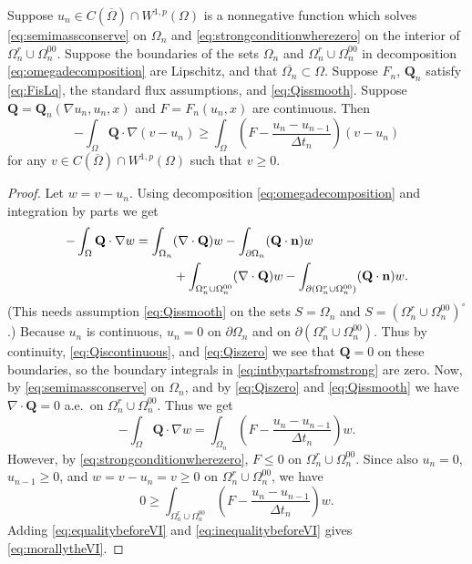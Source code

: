 \documentclass[final,onefignum]{siamart190516}
\newcommand\bn{\mathbf{n}}
\newcommand\bQ{\mathbf{Q}}
\newcommand{\Div}{\nabla\cdot}
\newcommand{\grad}{\nabla}
\begin{document}
\begin{theorem} \label{thm:strongimpliesweak}  Suppose $u_n \in C(\overline{\Omega}) \cap W^{1,p}(\Omega)$ is a nonnegative function which solves \eqref{eq:semimassconserve} on $\Omega_n$ and \eqref{eq:strongconditionwherezero} on the interior of $\Omega_n^r \cup \Omega_n^{00}$.  Suppose the boundaries of the sets $\Omega_n$ and $\Omega_n^r \cup \Omega_n^{00}$ in decomposition \eqref{eq:omegadecomposition} are Lipschitz, and that $\overline{\Omega_n} \subset \Omega$.  Suppose $F_n$, $\bQ_n$ satisfy \eqref{eq:FisLq}, the standard flux assumptions, and \eqref{eq:Qissmooth}.  Suppose $\bQ = \bQ_n(\grad u_n,u_n,x)$ and $F=F_n(u_n,x)$ are continuous.  Then
\begin{equation}
-\int_{\Omega} \bQ \cdot \grad(v-u_n) \ge \int_{\Omega} \left(F - \frac{u_n - u_{n-1}}{\Delta t_n}\right) (v-u_n) \label{eq:morallytheVI}
\end{equation}
for any $v \in C(\overline{\Omega}) \cap W^{1,p}(\Omega)$ such that $v \ge 0$.
\end{theorem}

\begin{proof}  Let $w=v-u_n$.  Using decomposition \eqref{eq:omegadecomposition} and integration by parts we get
\begin{align}
-\int_{\Omega} \bQ \cdot \grad w &= \int_{\Omega_n} (\Div \bQ) w - \int_{\partial \Omega_n} (\bQ \cdot \bn) w \label{eq:intbypartsfromstrong} \\
  &\qquad\quad + \int_{\Omega_n^r \cup \Omega_n^{00}} (\Div \bQ) w - \int_{\partial(\Omega_n^r \cup \Omega_n^{00})} (\bQ \cdot \bn) w. \notag
\end{align}
(This needs assumption \eqref{eq:Qissmooth} on the sets $S=\Omega_n$ and $S=(\Omega_n^r \cup \Omega_n^{00})^\circ$.)  Because $u_n$ is continuous, $u_n=0$ on $\partial \Omega_n$ and on $\partial(\Omega_n^r \cup \Omega_n^{00})$.  Thus by continuity, \eqref{eq:Qiscontinuous}, and \eqref{eq:Qiszero} we see that $\bQ=0$ on these boundaries, so the boundary integrals in \eqref{eq:intbypartsfromstrong} are zero.  Now, by \eqref{eq:semimassconserve} on $\Omega_n$, and by \eqref{eq:Qiszero} and \eqref{eq:Qissmooth} we have $\Div \bQ=0$ a.e.~on $\Omega_n^r \cup \Omega_n^{00}$.  Thus we get
\begin{equation}
-\int_{\Omega} \bQ \cdot \grad w = \int_{\Omega_n} \left(F - \frac{u_n - u_{n-1}}{\Delta t_n}\right) w. \label{eq:equalitybeforeVI}
\end{equation}
However, by \eqref{eq:strongconditionwherezero}, $F \le 0$ on $\Omega_n^r \cup \Omega_n^{00}$.  Since also $u_n=0$, $u_{n-1}\ge 0$, and $w = v-u_n = v \ge 0$ on $\Omega_n^r \cup \Omega_n^{00}$, we have
\begin{equation}
    0 \ge \int_{\Omega_n^r \cup \Omega_n^{00}} \left(F - \frac{u_n - u_{n-1}}{\Delta t_n}\right) w. \label{eq:inequalitybeforeVI}
\end{equation}
Adding \eqref{eq:equalitybeforeVI} and \eqref{eq:inequalitybeforeVI} gives \eqref{eq:morallytheVI}.
\end{proof}
\end{document}
